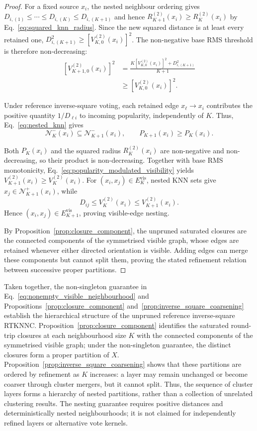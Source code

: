 \documentclass[pdflatex,sn-basic,Numbered]{sn-jnl}
\newcommand{\calN}{\mathcal{N}}
\begin{document}
\begin{proof}
For a fixed source $x_i$, the nested neighbour ordering gives
$D_{i,(1)}\leq\cdots\leq D_{i,(K)}\leq D_{i,(K+1)}$ and hence
$R_{K+1}^{(2)}(x_i)\geq R_K^{(2)}(x_i)$ by
Eq.~\eqref{eq:squared_knn_radius}. Since the new squared distance is at
least every retained one, $D_{i,(K+1)}^2\geq[V_{K,0}^{(2)}(x_i)]^2$.
The non-negative base RMS threshold is therefore non-decreasing:
\[
\begin{aligned}
\left[V_{K+1,0}^{(2)}(x_i)\right]^2
&=\frac{K\left[V_{K,0}^{(2)}(x_i)\right]^2+D_{i,(K+1)}^2}{K+1}\\
&\geq\left[V_{K,0}^{(2)}(x_i)\right]^2.
\end{aligned}
\]

Under reference inverse-square voting, each retained edge $x_\ell\to x_i$
contributes the positive quantity $1/D_{\ell i}$ to incoming popularity,
independently of $K$. Thus, Eq.~\eqref{eq:nested_knn} gives
\[
\calN_K^-(x_i)\subseteq\calN_{K+1}^-(x_i),
\qquad P_{K+1}(x_i)\geq P_K(x_i).
\]

Both $P_K(x_i)$ and the squared radius $R_K^{(2)}(x_i)$ are non-negative and non-decreasing, so their product is non-decreasing. Together with base
RMS monotonicity, Eq.~\eqref{eq:popularity_modulated_visibility} yields
$V_{K+1}^{(2)}(x_i)\geq V_K^{(2)}(x_i)$.
For $(x_i,x_j)\in E_K^{\mathrm{vis}}$, nested KNN sets give
$x_j\in\calN_{K+1}^+(x_i)$, while
\[
D_{ij}\leq V_K^{(2)}(x_i)\leq V_{K+1}^{(2)}(x_i).
\]
Hence $(x_i,x_j)\in E_{K+1}^{\mathrm{vis}}$, proving visible-edge nesting.

By Proposition~\ref{prop:closure_component}, the unpruned saturated closures
are the connected components of the symmetrised visible graph, whose edges
are retained whenever either directed orientation is visible. Adding edges
can merge these components but cannot split them, proving the stated
refinement relation between successive proper partitions.
\end{proof}

Taken together, the non-singleton guarantee in
Eq.~\eqref{eq:nonempty_visible_neighbourhood} and
Propositions~\ref{prop:closure_component}
and~\ref{prop:inverse_square_coarsening} establish the hierarchical
structure of the unpruned reference inverse-square RTKNNC.
Proposition~\ref{prop:closure_component} identifies the saturated
round-trip closures at each neighbourhood size \(K\) with the connected
components of the symmetrised visible graph; under the non-singleton
guarantee, the distinct closures form a proper partition of \(X\).
Proposition~\ref{prop:inverse_square_coarsening} shows that these partitions
are ordered by refinement as \(K\) increases: a layer may remain unchanged
or become coarser through cluster mergers, but it cannot split.
Thus, the sequence of cluster layers forms a hierarchy of nested partitions,
rather than a collection of unrelated clustering results.
The nesting guarantee requires positive distances and deterministically nested
neighbourhoods; it is not claimed for independently refined layers or
alternative vote kernels.
\end{document}
